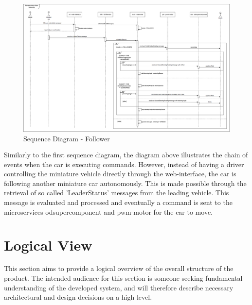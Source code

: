 \documentclass[12pt]{article}
\begin{document}
\FloatBarrier %
\FloatBarrier %
\begin{figure}[ht!]
\centering
\includegraphics[width=\linewidth]{Diagrams/SequenceDiagramsManeuveringFollower.png}
\caption{Sequence Diagram - Follower}
\label{fig:SD_maneuvering_follower}
\end{figure}
\FloatBarrier %

Similarly to the first sequence diagram, the diagram above illustrates the chain of events when the car is executing commands. However, instead of having a driver controlling the miniature vehicle directly through the web-interface, the car is following another miniature car autonomously. This is made possible through the retrieval of so called 'LeaderStatus' messages from the leading vehicle. This message is evaluated and processed and eventually a command is sent to the microservices odsupercomponent and pwm-motor for the car to move.


\section{Logical View}
This section aims to provide a logical overview of the overall structure of the product. The intended audience for this section is someone seeking fundamental understanding of the developed system, and will therefore describe necessary architectural and design decisions on a high level. 
\end{document}
